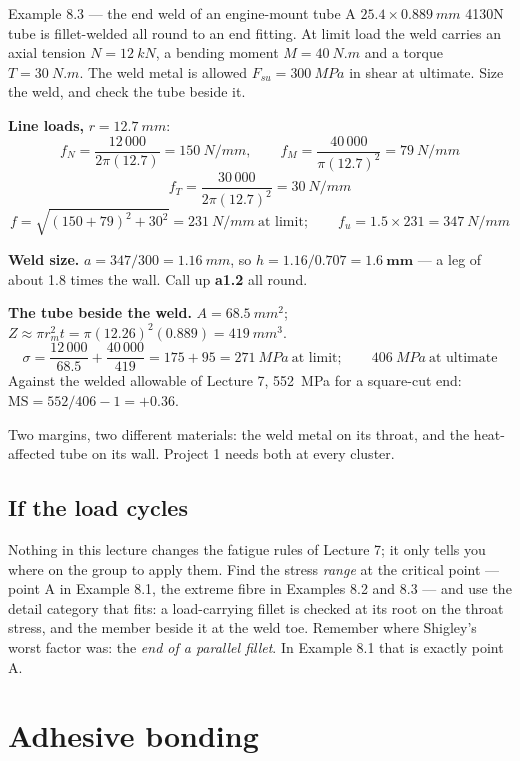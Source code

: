 \documentclass[11pt,a4paper]{article}
\begin{document}
\begin{examplebox}{Example 8.3 --- the end weld of an engine-mount tube}
A $25.4\times\SI{0.889}{mm}$ 4130N tube is fillet-welded all round to an end fitting. At limit load
the weld carries an axial tension $N=\SI{12}{kN}$, a bending moment $M=\SI{40}{N.m}$ and a torque
$T=\SI{30}{N.m}$. The weld metal is allowed $F_{su}=\SI{300}{MPa}$ in shear at ultimate. Size the
weld, and check the tube beside it.

\medskip
\textbf{Line loads,} $r=\SI{12.7}{mm}$:
\[ f_N=\frac{12\,000}{2\pi(12.7)}=\SI{150}{N/mm},\qquad f_M=\frac{40\,000}{\pi(12.7)^2}=\SI{79}{N/mm} \]
\[ f_T=\frac{30\,000}{2\pi(12.7)^2}=\SI{30}{N/mm} \]
\[ f=\sqrt{(150+79)^2+30^2}=\SI{231}{N/mm}\ \text{at limit};\qquad f_u=1.5\times231=\SI{347}{N/mm} \]

\textbf{Weld size.} $a=347/300=\SI{1.16}{mm}$, so $h=1.16/0.707=\mathbf{\SI{1.6}{mm}}$ --- a leg of
about 1.8 times the wall. Call up \textbf{a1.2} all round.

\medskip
\textbf{The tube beside the weld.} $A=\SI{68.5}{mm^2}$; $Z\approx\pi r_m^2 t=\pi(12.26)^2(0.889)=
\SI{419}{mm^3}$.
\[ \sigma=\frac{12\,000}{68.5}+\frac{40\,000}{419}=175+95=\SI{271}{MPa}\ \text{at limit};\qquad \SI{406}{MPa}\ \text{at ultimate} \]
Against the welded allowable of Lecture 7, \SI{552}{MPa} for a square-cut end:
$\mathrm{MS}=552/406-1=\mathbf{+0.36}$.

\medskip
Two margins, two different materials: the weld metal on its throat, and the heat-affected tube on
its wall. Project 1 needs both at every cluster.
\end{examplebox}

\subsection*{If the load cycles}

Nothing in this lecture changes the fatigue rules of Lecture 7; it only tells you where on the
group to apply them. Find the stress \emph{range} at the critical point --- point A in Example 8.1,
the extreme fibre in Examples 8.2 and 8.3 --- and use the detail category that fits: a
load-carrying fillet is checked at its root on the throat stress, and the member beside it at the
weld toe. Remember where Shigley's worst factor was: the \emph{end of a parallel fillet}. In
Example 8.1 that is exactly point A.

\section{Adhesive bonding}
\label{sec:bond}
\end{document}
